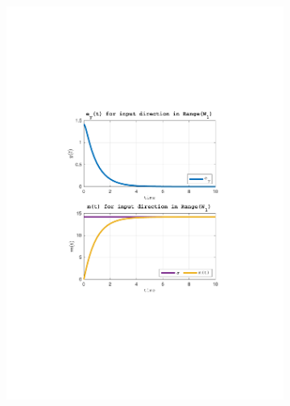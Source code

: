 \documentclass[a4paper, 12pt]{article}
\begin{document}
\begin{figure}[h!]{}
\begin{subfigure}[t]{0.32\textwidth}
           \includegraphics[width=\textwidth]{Figures/fig03b.pdf}
           \label{fig:fig03b}
    \end{subfigure}
    \begin{subfigure}[t]{0.32\textwidth}

\end{subfigure}
\end{figure}
\end{document}

